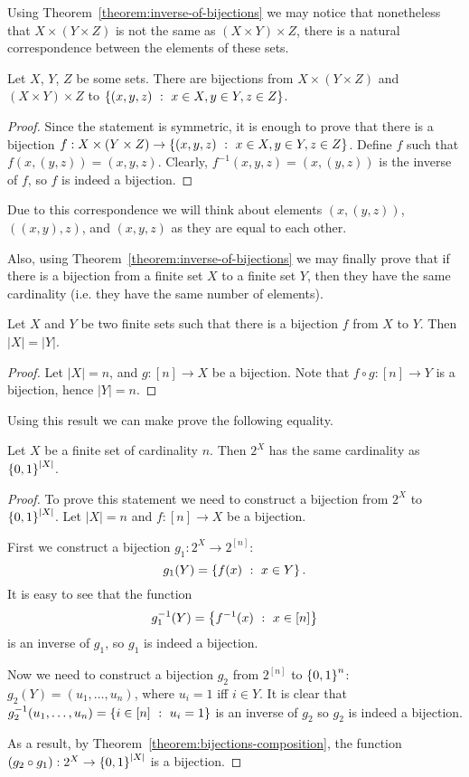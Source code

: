 Using Theorem~\ref{theorem:inverse-of-bijections} we may notice that
nonetheless that $X \times (Y \times Z)$ is not the same as
$(X \times Y) \times Z$, there is a natural correspondence between the elements
of these sets.
\begin{theorem}
  Let $X$, $Y$, $Z$ be some sets.
  There are bijections from $X \times (Y \times Z)$ and
  $(X \times Y) \times Z$ to $\set[x \in X, y \in Y, z \in Z]{(x, y, z)}$.
\end{theorem}
\begin{proof}
  Since the statement is symmetric, it is enough to prove that there is
  a bijection $f : X \times (Y \times Z) \to
  \set[x \in X, y \in Y, z \in Z]{(x, y, z)}$. Define $f$ such that
  $f(x, (y, z)) = (x, y, z)$.
  Clearly, $f^{-1}(x, y, z) = (x, (y, z))$ is the inverse of $f$, so $f$ is
  indeed a bijection.
\end{proof}
Due to this correspondence we will think about elements $(x, (y, z))$,
$((x, y), z)$, and $(x, y, z)$ as they are equal to each other.

Also, using Theorem~\ref{theorem:inverse-of-bijections} we may finally prove
that if there is a bijection from a finite set $X$ to a finite set $Y$, then
they have the same cardinality (i.e. they have the same number of elements).
\begin{theorem}
  Let $X$ and $Y$ be two finite sets such that there is a bijection $f$ from
  $X$ to $Y$. Then $|X| = |Y|$.
\end{theorem}
\begin{proof}
  Let $|X| = n$, and $g : [n] \to X$ be a bijection.
  Note that $f \circ g : [n] \to Y$ is a bijection, hence $|Y| = n$.
\end{proof}

Using this result we can make prove the following equality.
\begin{corollary}
\label{corollary:power-set-and-set-of-binary-strings}
  Let $X$ be a finite set of cardinality $n$. Then $2^X$ has the same
  cardinality as $\set{0, 1}^{|X|}$.
\end{corollary}
\begin{proof}
  To prove this statement we need to construct a bijection from $2^X$ to
  $\set{0, 1}^{|X|}$. Let $|X| = n$ and $f : [n] \to X$ be a bijection.

  First we construct a bijection $g_1 : 2^X \to 2^{[n]}$:
  \[
    g_1(Y) = \set[x \in Y]{f(x)}.
  \] It is easy to see that the function
  \[
    g^{-1}_1(Y) = \set[{x \in [n]}]{f^{-1}(x)}
  \]
  is an inverse of $g_1$, so $g_1$ is indeed a bijection.

  Now we need to construct a bijection $g_2$ from $2^{[n]}$ to $\set{0, 1}^n$:
  $g_2(Y) = (u_1, \dots, u_n)$, where $u_i = 1$ iff $i \in Y$. It is clear
  that $g^{-1}_2(u_1, \dots, u_n) = \set[u_i = 1]{i \in [n]}$ is an inverse
  of $g_2$ so $g_2$ is indeed a bijection.

  As a result, by Theorem~\ref{theorem:bijections-composition}, the function
  $(g_2 \circ g_1) : 2^X \to \set{0, 1}^{|X|}$ is a bijection.
\end{proof}

